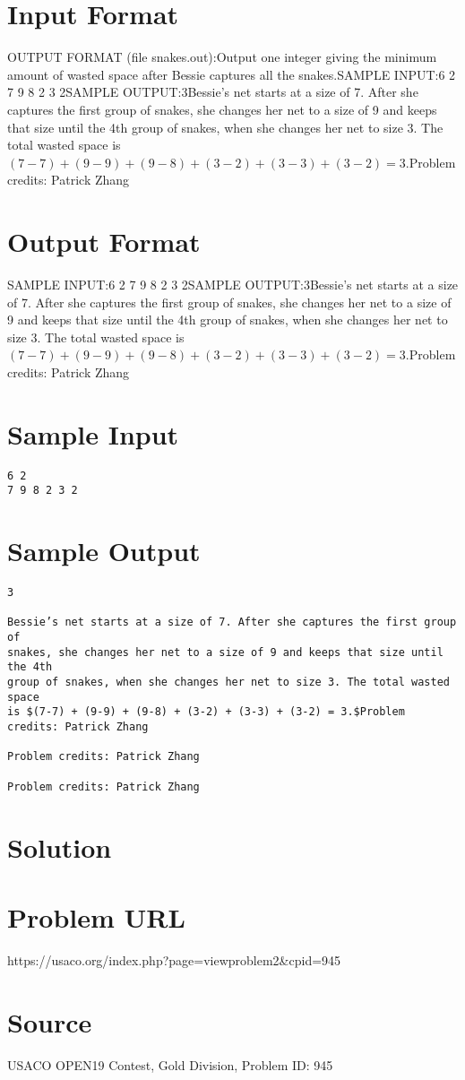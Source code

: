 \documentclass[12pt]{article}
\begin{document}
\section*{Input Format}
OUTPUT FORMAT (file snakes.out):Output one integer giving the minimum amount of wasted space after Bessie 
captures all the snakes.SAMPLE INPUT:6 2
7 9 8 2 3 2SAMPLE OUTPUT:3Bessie’s net starts at a size of 7. After she captures the first group of
snakes, she changes her net to a size of 9 and keeps that size until the 4th
group of snakes, when she changes her net to size 3. The total wasted space
is $(7-7) + (9-9) + (9-8) + (3-2) + (3-3) + (3-2) = 3.$Problem credits: Patrick Zhang

\section*{Output Format}
SAMPLE INPUT:6 2
7 9 8 2 3 2SAMPLE OUTPUT:3Bessie’s net starts at a size of 7. After she captures the first group of
snakes, she changes her net to a size of 9 and keeps that size until the 4th
group of snakes, when she changes her net to size 3. The total wasted space
is $(7-7) + (9-9) + (9-8) + (3-2) + (3-3) + (3-2) = 3.$Problem credits: Patrick Zhang

\section*{Sample Input}
\begin{verbatim}
6 2
7 9 8 2 3 2
\end{verbatim}

\section*{Sample Output}
\begin{verbatim}
3

Bessie’s net starts at a size of 7. After she captures the first group of
snakes, she changes her net to a size of 9 and keeps that size until the 4th
group of snakes, when she changes her net to size 3. The total wasted space
is $(7-7) + (9-9) + (9-8) + (3-2) + (3-3) + (3-2) = 3.$Problem credits: Patrick Zhang

Problem credits: Patrick Zhang

Problem credits: Patrick Zhang
\end{verbatim}

\section*{Solution}


\section*{Problem URL}
https://usaco.org/index.php?page=viewproblem2&cpid=945

\section*{Source}
USACO OPEN19 Contest, Gold Division, Problem ID: 945
\end{document}
